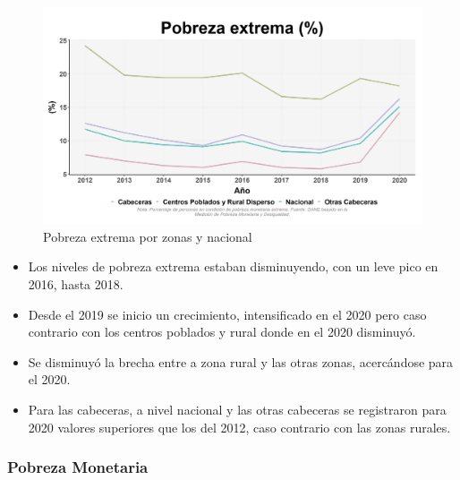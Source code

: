     \begin{figure}[H]
        \caption{Pobreza extrema por zonas y nacional \label{map_result_2} }
        \begin{center}
        \includegraphics[width=\textwidth,keepaspectratio]{img/var_260_trend.png}
        \end{center}
    \end{figure}
            \begin{itemize}
                    \item Los niveles de pobreza extrema estaban disminuyendo, con un leve pico en 2016, hasta 2018.
                    \item Desde el 2019 se inicio un crecimiento, intensificado en el 2020 pero caso contrario con los centros poblados y rural donde en el 2020 disminuyó.
                    \item Se disminuyó la brecha entre a zona rural y las otras zonas, acercándose para el 2020.
                    \item Para las cabeceras, a nivel nacional y las otras cabeceras se registraron para 2020 valores superiores que los del 2012, caso contrario con las zonas rurales. 
                    \end{itemize}

\subsubsection{Pobreza Monetaria}

